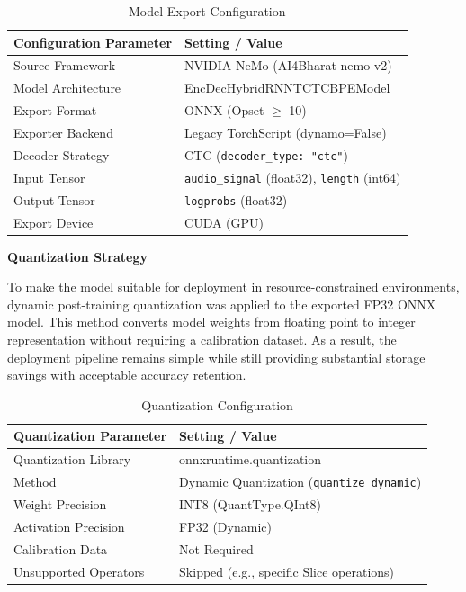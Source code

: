 \begin{table}[H]
\caption{Model Export Configuration}
\centering
\begin{tabular}{|l|l|}
\hline
\textbf{Configuration Parameter} & \textbf{Setting / Value} \\
\hline
Source Framework & NVIDIA NeMo (AI4Bharat nemo-v2) \\
Model Architecture & EncDecHybridRNNTCTCBPEModel \\
Export Format & ONNX (Opset $\geq$ 10) \\
Exporter Backend & Legacy TorchScript (dynamo=False) \\
Decoder Strategy & CTC (\texttt{decoder\_type: "ctc"}) \\
Input Tensor & \texttt{audio\_signal} (float32), \texttt{length} (int64) \\
Output Tensor & \texttt{logprobs} (float32) \\
Export Device & CUDA (GPU) \\
\hline
\end{tabular}
\end{table}

\textbf{Quantization Strategy}

To make the model suitable for deployment in resource-constrained environments, dynamic post-training quantization was applied to the exported FP32 ONNX model. This method converts model weights from floating point to integer representation without requiring a calibration dataset. As a result, the deployment pipeline remains simple while still providing substantial storage savings with acceptable accuracy retention.

\begin{table}[H]
\caption{Quantization Configuration}
\centering
\begin{tabular}{|l|l|}
\hline
\textbf{Quantization Parameter} & \textbf{Setting / Value} \\
\hline
Quantization Library & onnxruntime.quantization \\
Method & Dynamic Quantization (\texttt{quantize\_dynamic}) \\
Weight Precision & INT8 (QuantType.QInt8) \\
Activation Precision & FP32 (Dynamic) \\
Calibration Data & Not Required \\
Unsupported Operators & Skipped (e.g., specific Slice operations) \\
\hline
\end{tabular}
\end{table}

